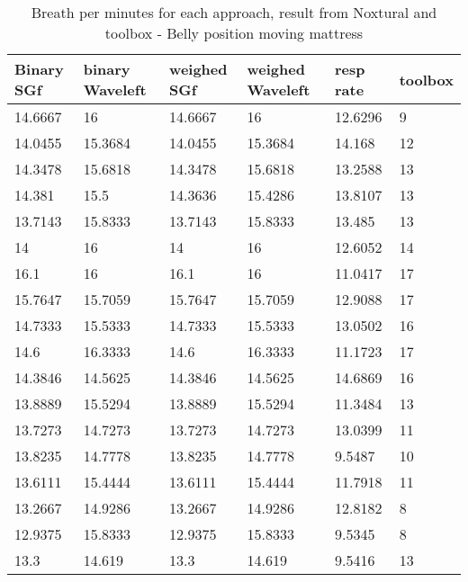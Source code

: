 \begin{table}
\begin{tabular}{|llllll|}
\hline 
Binary SGf & binary Waveleft & weighed  SGf & weighed Waveleft & resp rate & toolbox \\ 
\hline 
14.6667 & 16 & 14.6667 & 16 & 12.6296 & 9 \\ 
14.0455 & 15.3684 & 14.0455 & 15.3684 & 14.168 & 12 \\ 
14.3478 & 15.6818 & 14.3478 & 15.6818 & 13.2588 & 13 \\ 
14.381 & 15.5 & 14.3636 & 15.4286 & 13.8107 & 13 \\ 
13.7143 & 15.8333 & 13.7143 & 15.8333 & 13.485 & 13 \\ 
14 & 16 & 14 & 16 & 12.6052 & 14 \\ 
16.1 & 16 & 16.1 & 16 & 11.0417 & 17 \\ 
15.7647 & 15.7059 & 15.7647 & 15.7059 & 12.9088 & 17 \\ 
14.7333 & 15.5333 & 14.7333 & 15.5333 & 13.0502 & 16 \\ 
14.6 & 16.3333 & 14.6 & 16.3333 & 11.1723 & 17 \\ 
14.3846 & 14.5625 & 14.3846 & 14.5625 & 14.6869 & 16 \\ 
13.8889 & 15.5294 & 13.8889 & 15.5294 & 11.3484 & 13 \\ 
13.7273 & 14.7273 & 13.7273 & 14.7273 & 13.0399 & 11 \\ 
13.8235 & 14.7778 & 13.8235 & 14.7778 & 9.5487 & 10 \\ 
13.6111 & 15.4444 & 13.6111 & 15.4444 & 11.7918 & 11 \\ 
13.2667 & 14.9286 & 13.2667 & 14.9286 & 12.8182 & 8 \\ 
12.9375 & 15.8333 & 12.9375 & 15.8333 & 9.5345 & 8 \\ 
13.3 & 14.619 & 13.3 & 14.619 & 9.5416 & 13 \\ 
\hline 
\end{tabular}\caption{Breath per minutes for each approach, result from Noxtural and toolbox
- Belly position moving mattress}
\end{table}
